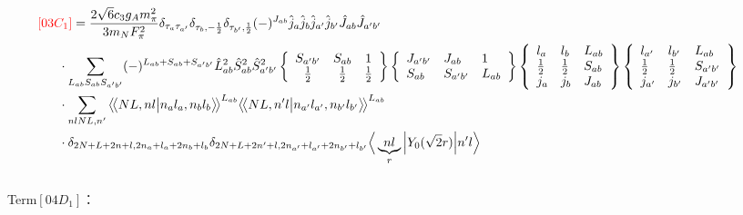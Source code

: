 \documentclass[master]{shnuthesis}
\newcommand{\llangle}{\big\langle\!\big\langle}
\newcommand{\rrangle}{\big\rangle\!\big\rangle}
\newcommand{\ap}{a^\prime}
\newcommand{\bp}{b^\prime}
\newcommand{\il}{\!\!\!\!\!\!\!\!\!\!}
\begin{document}
\begin{align}
    &\il {\color{red} [03C_1]}= \frac{2\sqrt{6}c_3g_A m_\pi^2}{3m_N F_{\pi}^2} \delta_{\tau_a \tau_{\ap}}\delta_{\tau_b, -\frac{1}{2}}\delta_{\tau_{\bp}, \frac{1}{2}} (-)^{J_{ab}}\hat{j}_a\hat{j}_b\hat{j}_{\ap}\hat{j}_{\bp}\hat{J}_{ab}\hat{J}_{\ap\bp}  \notag\\
    & \cdot \sum_{L_{ab}S_{ab}S_{\ap\bp}} (-)^{L_{ab}+S_{ab}+S_{\ap\bp}} \hat{L}_{ab}^2\hat{S}_{ab}^2\hat{S}_{\ap\bp}^2  \left\{\begin{array}{ccc} S_{\ap\bp} & S_{ab} & 1 \\ \frac{1}{2} & \frac{1}{2} & \frac{1}{2} \end{array}\right\}  \left\{\begin{array}{lll} J_{\ap\bp} & J_{ab} & 1 \\ S_{ab} & S_{\ap\bp} & L_{ab} \end{array}\right\}  \left\{\begin{array}{lll}l_{a} & l_{b} & L_{ab} \\ \frac{1}{2} & \frac{1}{2} & S_{ab} \\j_{a} & j_{b} & J_{ab} \end{array}\right\} \left\{\begin{array}{lll} l_{\ap} & l_{\bp} & L_{ab} \\ \frac{1}{2} & \frac{1}{2} & S_{\ap\bp} \\j_{\ap} & j_{\bp} & J_{\ap\bp} \end{array}\right\}  \notag \\
    & \cdot \sum_{nlNL,n^\prime} \llangle N L, n l \big| n_{a} l_{a}, n_{b} l_{b} \rrangle^{L_{ab}} \llangle N L, n^\prime l \big| n_{a^\prime} l_{a^\prime}, n_{b^\prime} l_{b^\prime} \rrangle^{L_{ab}} \notag\\
    & \cdot \delta_{2N+L+2n+l,2n_a+l_a+2n_b+l_b}\delta_{2N+L+2n^\prime+l,2n_{a^\prime}+l_{a^\prime}+2n_{b^\prime}+l_{b^\prime}} \Big\langle \underbrace{n l}_{r} \Big| Y_0(\sqrt{2}r) \Big| n^\prime l \Big\rangle
\end{align}
\,\\
{\color{red}Term$[04D_1]$：}
\end{document}
